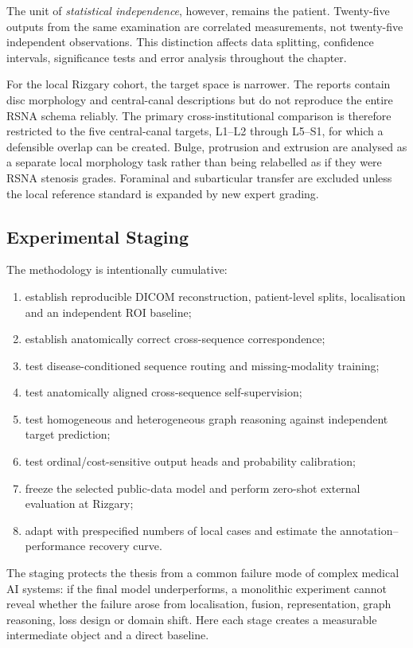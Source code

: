 The unit of \emph{statistical independence}, however, remains the patient.
Twenty-five outputs from the same examination are correlated measurements, not
twenty-five independent observations. This distinction affects data splitting,
confidence intervals, significance tests and error analysis throughout the
chapter.

For the local Rizgary cohort, the target space is narrower. The reports contain
disc morphology and central-canal descriptions but do not reproduce the entire
RSNA schema reliably. The primary cross-institutional comparison is therefore
restricted to the five central-canal targets, L1--L2 through L5--S1, for which a
defensible overlap can be created. Bulge, protrusion and extrusion are analysed
as a separate local morphology task rather than being relabelled as if they were
RSNA stenosis grades. Foraminal and subarticular transfer are excluded unless
the local reference standard is expanded by new expert grading.

\subsection{Experimental Staging}
\label{sec:method-staging}

The methodology is intentionally cumulative:

\begin{enumerate}
  \item establish reproducible DICOM reconstruction, patient-level splits,
  localisation and an independent ROI baseline;
  \item establish anatomically correct cross-sequence correspondence;
  \item test disease-conditioned sequence routing and missing-modality training;
  \item test anatomically aligned cross-sequence self-supervision;
  \item test homogeneous and heterogeneous graph reasoning against independent
        target prediction;
  \item test ordinal/cost-sensitive output heads and probability calibration;
  \item freeze the selected public-data model and perform zero-shot external
        evaluation at Rizgary;
  \item adapt with prespecified numbers of local cases and estimate the
        annotation--performance recovery curve.
\end{enumerate}

The staging protects the thesis from a common failure mode of complex medical AI
systems: if the final model underperforms, a monolithic experiment cannot reveal
whether the failure arose from localisation, fusion, representation, graph
reasoning, loss design or domain shift. Here each stage creates a measurable
intermediate object and a direct baseline.

